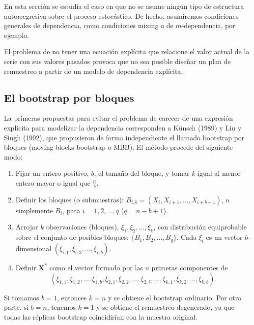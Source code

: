 \documentclass[
]{book}
\theoremstyle{break}
\theoremstyle{definition}
\theoremstyle{definition}
\theoremstyle{definition}
\theoremstyle{remark}
\begin{document}
En esta sección se estudia el caso en que no se asume ningún tipo de
estructura autorregresiva sobre el proceso estocástico. De hecho,
asumiremos condiciones generales de dependencia, como condiciones mixing
o de \(m\)-dependencia, por ejemplo.

El problema de no tener una ecuación explícita que relacione el valor
actual de la serie con sus valores pasados provoca que no sea posible
diseñar un plan de remuestreo a partir de un modelo de dependencia
explícita.

\hypertarget{el-bootstrap-por-bloques}{%
\subsection{El bootstrap por bloques}\label{el-bootstrap-por-bloques}}

La primeras propuestas para evitar el problema de carecer de una
expresión explícita para modelizar la dependencia corresponden a Künsch
(1989) y Liu y Singh (1992), que propusieron de forma independiente el
llamado bootstrap por bloques (moving blocks bootstrap o MBB). El método
procede del siguiente modo:

\begin{enumerate}
\def\labelenumi{\arabic{enumi}.}
\item
  Fijar un entero positivo, \(b\), el tamaño del bloque, y tomar \(k\)
  igual al menor entero mayor o igual que \(\frac{n}{b}\).
\item
  Definir los bloques (o submuestras): \(B_{i,b}=(X_i,X_{i+1},\ldots ,X_{i+b-1})\), o simplemente \(B_i\), para \(i=1,2,\ldots ,q\)
  (\(q=n-b+1\))\(.\)
\item
  Arrojar \(k\) observaciones (bloques), \(\xi _1,\xi _2,\ldots ,\xi _{k}\), con distribución equiprobable sobre el conjunto de posibles
  bloques: \(\{B_1,B_2,\ldots ,B_{q}\}\). Cada \(\xi _i\) es un
  vector \(b\)-dimensional \((\xi _{i,1},\xi _{i,2},\ldots ,\xi _{i,b})\).
\item
  Definir \(\mathbf{X}^{\ast}\) como el vector formado por las \(n\)
  primeras componentes de
  \[(\xi _{1,1},\xi _{1,2},\ldots ,\xi _{1,b},\xi _{2,1},\xi _{2,2},\ldots ,\xi
  _{2,b},\ldots ,\xi _{k,1},\xi _{k,2},\ldots ,\xi _{k,b}).\]
\end{enumerate}

Si tomamos \(b=1\), entonces \(k=n\) y se obtiene el bootstrap ordinario.
Por otra parte, si \(b=n\), tenemos \(k=1\) y se obtiene el remuestreo
degenerado, ya que todas las réplicas bootstrap coincidirían con la
muestra original.
\end{document}
